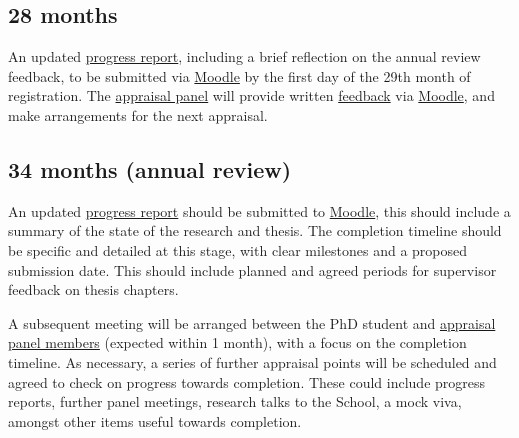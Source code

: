 \documentclass[12pt,a4paper]{article}
\begin{document}
\subsection{28 months} \label{sec:28months}
An updated \hyperref[sec:report]{progress report}, including a brief reflection on the annual review feedback, to be submitted via \href{https://modules.lancaster.ac.uk/course/view.php?id=7050}{Moodle} by the first day of the 29th month of registration. The \hyperref[sec:panel]{appraisal panel} will provide written \hyperref[sec:feedback]{feedback} via \href{https://modules.lancaster.ac.uk/course/view.php?id=7050}{Moodle}, and make arrangements for the next appraisal.


\subsection{34 months (annual review)} \label{sec:34months}
An updated \hyperref[sec:report]{progress report} should be submitted to \href{https://modules.lancaster.ac.uk/course/view.php?id=7050}{Moodle}, this should include a summary of the state of the research and thesis. The completion timeline should be specific and detailed at this stage, with clear milestones and a proposed submission date. This should include planned and agreed periods for supervisor feedback on thesis chapters.

A subsequent meeting will be arranged between the PhD student and \hyperref[sec:panel]{appraisal panel members} (expected within 1 month), with a focus on the completion timeline. As necessary, a series of further appraisal points will be scheduled and agreed to check on progress towards completion. These could include progress reports, further panel meetings, research talks to the School, a mock viva, amongst other items useful towards completion.

\newpage
\end{document}
